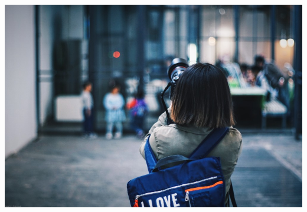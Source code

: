 \documentclass[12pt]{book}
\begin{document}
\includegraphics[width=1\textwidth]{images/photo1000.jpg}
\end{document}
